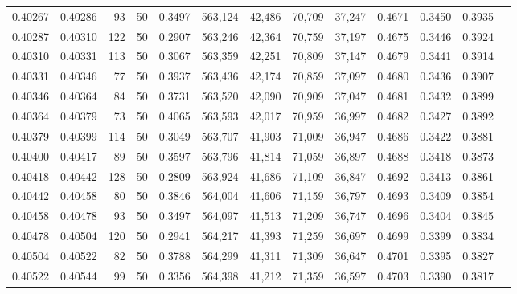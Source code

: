 \begin{tabular}{rrrrrrrrrrrrr}
0.40267 & 0.40286 &    93 &  50 &                                     0.3497 & 563,124 &  42,486 &  70,709 &  37,247 & 0.4671 & 0.3450 & 0.3935 \\
0.40287 & 0.40310 &   122 &  50 &                                     0.2907 & 563,246 &  42,364 &  70,759 &  37,197 & 0.4675 & 0.3446 & 0.3924 \\
0.40310 & 0.40331 &   113 &  50 &                                     0.3067 & 563,359 &  42,251 &  70,809 &  37,147 & 0.4679 & 0.3441 & 0.3914 \\
0.40331 & 0.40346 &    77 &  50 &                                     0.3937 & 563,436 &  42,174 &  70,859 &  37,097 & 0.4680 & 0.3436 & 0.3907 \\
0.40346 & 0.40364 &    84 &  50 &                                     0.3731 & 563,520 &  42,090 &  70,909 &  37,047 & 0.4681 & 0.3432 & 0.3899 \\
0.40364 & 0.40379 &    73 &  50 &                                     0.4065 & 563,593 &  42,017 &  70,959 &  36,997 & 0.4682 & 0.3427 & 0.3892 \\
0.40379 & 0.40399 &   114 &  50 &                                     0.3049 & 563,707 &  41,903 &  71,009 &  36,947 & 0.4686 & 0.3422 & 0.3881 \\
0.40400 & 0.40417 &    89 &  50 &                                     0.3597 & 563,796 &  41,814 &  71,059 &  36,897 & 0.4688 & 0.3418 & 0.3873 \\
0.40418 & 0.40442 &   128 &  50 &                                     0.2809 & 563,924 &  41,686 &  71,109 &  36,847 & 0.4692 & 0.3413 & 0.3861 \\
0.40442 & 0.40458 &    80 &  50 &                                     0.3846 & 564,004 &  41,606 &  71,159 &  36,797 & 0.4693 & 0.3409 & 0.3854 \\
0.40458 & 0.40478 &    93 &  50 &                                     0.3497 & 564,097 &  41,513 &  71,209 &  36,747 & 0.4696 & 0.3404 & 0.3845 \\
0.40478 & 0.40504 &   120 &  50 &                                     0.2941 & 564,217 &  41,393 &  71,259 &  36,697 & 0.4699 & 0.3399 & 0.3834 \\
0.40504 & 0.40522 &    82 &  50 &                                     0.3788 & 564,299 &  41,311 &  71,309 &  36,647 & 0.4701 & 0.3395 & 0.3827 \\
0.40522 & 0.40544 &    99 &  50 &                                     0.3356 & 564,398 &  41,212 &  71,359 &  36,597 & 0.4703 & 0.3390 & 0.3817 \\

\end{tabular}

